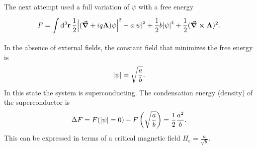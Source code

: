 The next attempt used a full variation of $\psi$ with a free energy
\begin{align*}
	F = \int\limits_{}^{}\dd[3]{\vb{r}}\frac{1}{2}\abs{(\grad{} + iq\vb{A})\psi}^{2} - a\abs{\psi}^{2} + \frac{1}{2}b\abs{\psi}^{4} + \frac{1}{2}(\curl{\vb{A}})^{2}.
\end{align*}
In the absence of external fields, the constant field that minimizes the free energy is
\begin{align*}
	\abs{\psi} = \sqrt{\frac{a}{b}}.
\end{align*}
In this state the system is superconducting. The condensation energy (density) of the superconductor is
\begin{align*}
	\Delta F = F(\abs{\psi} = 0) - F\left(\sqrt{\frac{a}{b}}\right) = \frac{1}{2}\frac{a^{2}}{b}.
\end{align*}
This can be expressed in terms of a critical magnetic field $H_{\text{c}} = \frac{a}{\sqrt{b}}$.

